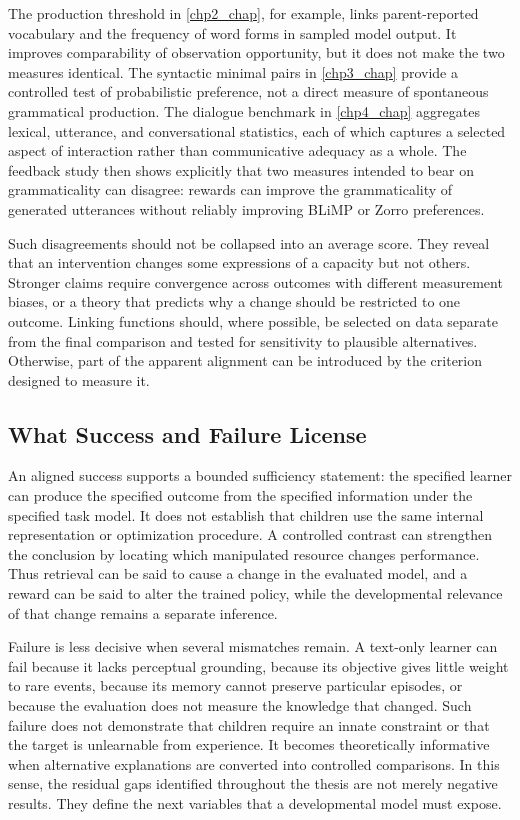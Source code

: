 The \meCDI{} production threshold in \cref{chp2_chap}, for example, links parent-reported vocabulary and the frequency of word forms in sampled model output. It improves comparability of observation opportunity, but it does not make the two measures identical. The syntactic minimal pairs in \cref{chp3_chap} provide a controlled test of probabilistic preference, not a direct measure of spontaneous grammatical production. The dialogue benchmark in \cref{chp4_chap} aggregates lexical, utterance, and conversational statistics, each of which captures a selected aspect of interaction rather than communicative adequacy as a whole. The feedback study then shows explicitly that two measures intended to bear on grammaticality can disagree: rewards can improve the grammaticality of generated utterances without reliably improving BLiMP or Zorro preferences.

Such disagreements should not be collapsed into an average score. They reveal that an intervention changes some expressions of a capacity but not others. Stronger claims require convergence across outcomes with different measurement biases, or a theory that predicts why a change should be restricted to one outcome. Linking functions should, where possible, be selected on data separate from the final comparison and tested for sensitivity to plausible alternatives. Otherwise, part of the apparent alignment can be introduced by the criterion designed to measure it.

\subsection{What Success and Failure License}
\label{sec:gd_calibration_claims}

An aligned success supports a bounded sufficiency statement: the specified learner can produce the specified outcome from the specified information under the specified task model. It does not establish that children use the same internal representation or optimization procedure. A controlled contrast can strengthen the conclusion by locating which manipulated resource changes performance. Thus retrieval can be said to cause a change in the evaluated model, and a reward can be said to alter the trained policy, while the developmental relevance of that change remains a separate inference.

Failure is less decisive when several mismatches remain. A text-only learner can fail because it lacks perceptual grounding, because its objective gives little weight to rare events, because its memory cannot preserve particular episodes, or because the evaluation does not measure the knowledge that changed. Such failure does not demonstrate that children require an innate constraint or that the target is unlearnable from experience. It becomes theoretically informative when alternative explanations are converted into controlled comparisons. In this sense, the residual gaps identified throughout the thesis are not merely negative results. They define the next variables that a developmental model must expose.

